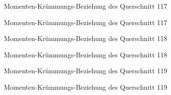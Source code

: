 \documentclass[
  11pt,
  letterpaper,
]{scrreprt}
\begin{document}
\begin{figure}[H]


\caption{\label{fig-qs_117}Momenten-Krümmungs-Beziehung des Querschnitt
117}

\end{figure}%

\begin{figure}[H]


\caption{\label{fig-m_chi_117}Momenten-Krümmungs-Beziehung des
Querschnitt 117}

\end{figure}%

\begin{figure}[H]


\caption{\label{fig-qs_118}Momenten-Krümmungs-Beziehung des Querschnitt
118}

\end{figure}%

\begin{figure}[H]


\caption{\label{fig-m_chi_118}Momenten-Krümmungs-Beziehung des
Querschnitt 118}

\end{figure}%

\begin{figure}[H]


\caption{\label{fig-qs_119}Momenten-Krümmungs-Beziehung des Querschnitt
119}

\end{figure}%

\begin{figure}[H]


\caption{\label{fig-m_chi_119}Momenten-Krümmungs-Beziehung des
Querschnitt 119}

\end{figure}%
\end{document}
